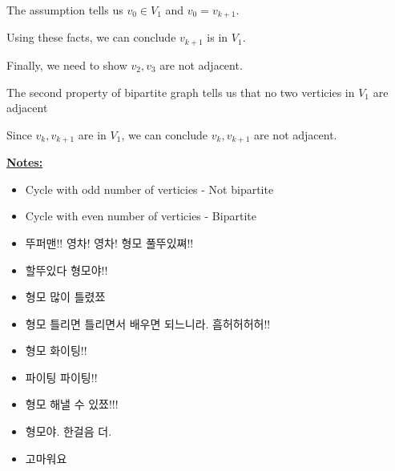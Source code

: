 \documentclass[12pt]{article}
\begin{document}
\begin{enumerate}[a.]
\begin{mdframed}
\begin{enumerate}[1.]
\begin{mdframed}
                \bigskip

                The assumption tells us $v_0 \in V_1$ and $v_0 = v_{k+1}$.

                \bigskip

                Using these facts, we can conclude $v_{k+1}$ is in $V_1$.

                \bigskip

                Finally, we need to show $v_2, v_3$ are not adjacent.

                \bigskip

                The second property of bipartite graph tells us that no two
                verticies in $V_1$ are adjacent

                \bigskip

                Since $v_k,v_{k+1}$ are in $V_1$, we can conclude $v_k,v_{k+1}$ are not
                adjacent.

            \end{mdframed}
        \end{enumerate}
    \end{mdframed}

    \underline{\textbf{Notes:}}

    \begin{itemize}
        \item Cycle with odd number of verticies - Not bipartite


        \item Cycle with even number of verticies - Bipartite


        \item 뚜퍼맨!! 영차! 영차! 형모 풀뚜있쪄!!
        \item 할뚜있다 형모야!!
        \item 형모 많이 틀렸쬬
        \item 형모 틀리면 틀리면서 배우면 되느니라. 흠허허허허!!
        \item 형모 화이팅!!
        \item 파이팅 파이팅!!
        \item 형모 해낼 수 있쬬!!!
        \item 형모야. 한걸음 더.
        \item 고마워요

    \end{itemize}

\end{enumerate}
\end{document}
